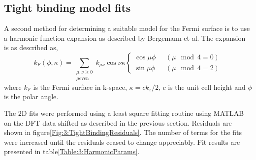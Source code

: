 {{{\clearpage

\subsection{Tight binding model fits}
    \label{Sec:3:TightBindingFits}

A second method for determining a suitable model for the Fermi surface is to use a harmonic function expansion as described by Bergemann et al\cite{Bergemann2000}. The expansion is as described as,
\begin{equation}
\label{Eqn:3:HarmonicExpansion}
k_F(\phi, \kappa) = \sum_{\substack{\mu,\nu \geq 0 \\ \mu \textrm{even}}}
    k_{\mu\nu}\cos\nu\kappa 
    \begin{cases}
        \cos{\mu\phi} \hspace{8pt} &(\mu\mod4 = 0) \\
        \sin{\mu\phi} \hspace{8pt} &(\mu\mod4 = 2)
    \end{cases}
\end{equation}
where $k_F$ is the Fermi surface in k-space, $\kappa = ck_z/2$, $c$ is the unit cell height and $\phi$ is the polar angle.

The 2D fits were performed using a least square fitting routine using MATLAB on the DFT data shifted as described in the previous section. Residuals are shown in figure\ref{Fig:3:TightBindingResiduals}. The number of terms for the fits were increased until the residuals ceased to change appreciably. Fit results are presented in table\ref{Table:3:HarmonicParams}.

}}}
